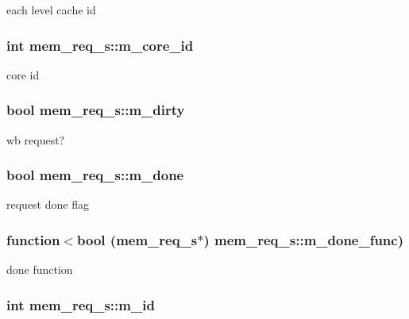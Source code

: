 \label{structmem__req__s_a136b8b016a5e922dbc766490e5478b3e}
each level cache id \hypertarget{structmem__req__s_ae79108aead8de2855cccdaf981cb81f8}{
\subsubsection[{m\_\-core\_\-id}]{\setlength{\rightskip}{0pt plus 5cm}int {\bf mem\_\-req\_\-s::m\_\-core\_\-id}}}
\label{structmem__req__s_ae79108aead8de2855cccdaf981cb81f8}
core id \hypertarget{structmem__req__s_ad03ad960252da07338a40f46a4c2f0da}{
\subsubsection[{m\_\-dirty}]{\setlength{\rightskip}{0pt plus 5cm}bool {\bf mem\_\-req\_\-s::m\_\-dirty}}}
\label{structmem__req__s_ad03ad960252da07338a40f46a4c2f0da}
wb request? \hypertarget{structmem__req__s_af3191e32583b52626b60ed9817a3768a}{
\subsubsection[{m\_\-done}]{\setlength{\rightskip}{0pt plus 5cm}bool {\bf mem\_\-req\_\-s::m\_\-done}}}
\label{structmem__req__s_af3191e32583b52626b60ed9817a3768a}
request done flag \hypertarget{structmem__req__s_a3170f1143be13457e12b0d0c6f8beb25}{
\subsubsection[{m\_\-done\_\-func}]{\setlength{\rightskip}{0pt plus 5cm}function$<$bool ({\bf mem\_\-req\_\-s}$\ast$) {\bf mem\_\-req\_\-s::m\_\-done\_\-func})}}
\label{structmem__req__s_a3170f1143be13457e12b0d0c6f8beb25}
done function \hypertarget{structmem__req__s_aa1ce2eda1984474c5304bc52e0f96445}{
\subsubsection[{m\_\-id}]{\setlength{\rightskip}{0pt plus 5cm}int {\bf mem\_\-req\_\-s::m\_\-id}}}
